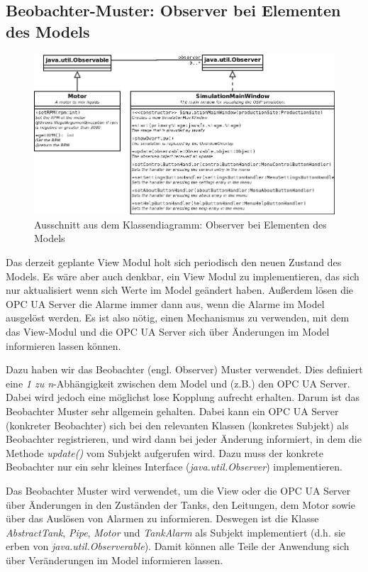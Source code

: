 \documentclass[parskip=full]{scrartcl}
\begin{document}
\subsection{Beobachter-Muster: Observer bei Elementen des Models}
\begin{figure}[H]
  \centering
  \includegraphics[scale=0.35]{design/pattern-screenshots/observer-Model.png}
  \caption{Ausschnitt aus dem Klassendiagramm: Observer bei Elementen des Models}
\end{figure}
Das derzeit geplante View Modul holt sich periodisch den neuen Zustand des Models. Es wäre aber auch denkbar, ein View Modul zu implementieren,
das sich nur aktualisiert wenn sich Werte im Model geändert haben. Außerdem lösen die OPC UA Server die Alarme immer dann aus, wenn die Alarme im Model
ausgelöst werden. Es ist also nötig, einen Mechanismus zu verwenden, mit dem das View-Modul und die OPC UA Server sich über Änderungen im Model informieren
lassen können.

Dazu haben wir das Beobachter (engl. Observer) Muster verwendet. Dies definiert eine \emph{1 zu n}-Abhängigkeit zwischen dem Model und (z.B.) den OPC UA Server.
Dabei wird jedoch eine möglichst lose Kopplung aufrecht erhalten. Darum ist das Beobachter Muster sehr allgemein gehalten. Dabei kann ein OPC UA Server (konkreter Beobachter)
sich bei den relevanten Klassen (konkretes Subjekt) als Beobachter registrieren, und wird dann bei jeder Änderung informiert, in dem die Methode \emph{update()}
vom Subjekt aufgerufen wird. Dazu muss der konkrete Beobachter nur ein sehr kleines Interface (\emph{java.util.Observer}) implementieren.

Das Beobachter Muster wird verwendet, um die View oder die OPC UA Server über Änderungen in den Zuständen der Tanks, den Leitungen, dem Motor sowie über
das Auslösen von Alarmen zu informieren. Deswegen ist die Klasse \emph{AbstractTank}, \emph{Pipe}, \emph{Motor} und \emph{TankAlarm} als Subjekt implementiert
(d.h. sie erben von \emph{java.util.Observerable}). Damit können alle Teile der Anwendung sich über Veränderungen im Model informieren lassen.
\end{document}
